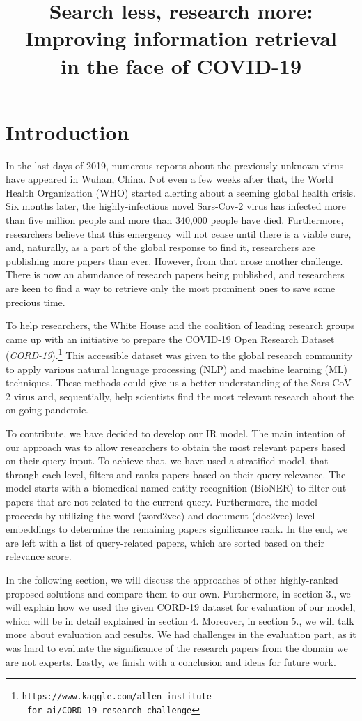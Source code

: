 \documentclass[10pt, a4paper]{article}
\title{
	Search less, research more: Improving information retrieval\\
	in the face of COVID-19\\
}
\begin{document}
	
	\maketitleabstract
	
	\section{Introduction}
	
	In the last days of 2019, numerous reports about the previously-unknown virus have appeared in Wuhan, China. Not even a few weeks after that, the World Health Organization (WHO) started alerting about a seeming global health crisis. Six months later, the highly-infectious novel Sars-Cov-2 virus has infected more than five million people and more than 340,000 people have died. Furthermore, researchers believe that this emergency will not cease until there is a viable cure, and, naturally, as a part of the global response to find it, researchers are publishing more papers than ever. However, from that arose another challenge. There is now an abundance of research papers being published, and researchers are keen to find a way to retrieve only the most prominent ones to save some precious time.
	
	To help researchers, the White House and the coalition of leading research groups came up with an initiative to prepare the COVID-19 Open Research Dataset (\emph{CORD-19}).\footnote{\texttt{https://www.kaggle.com/allen-institute\\-for-ai/CORD-19-research-challenge}} This accessible dataset was given to the global research community to apply various natural language processing (NLP) and machine learning (ML) techniques. These methods could give us a better understanding of the Sars-CoV-2 virus and, sequentially, help scientists find the most relevant research about the on-going pandemic.
	
	To contribute, we have decided to develop our IR model. The main intention of our approach was to allow researchers to obtain the most relevant papers based on their query input. To achieve that, we have used a stratified model, that through each level, filters and ranks papers based on their query relevance.  The model starts with a biomedical named entity recognition (BioNER) to filter out papers that are not related to the current query. Furthermore, the model proceeds by utilizing the word (word2vec) and document (doc2vec) level embeddings to determine the remaining papers significance rank. In the end, we are left with a list of query-related papers, which are sorted based on their relevance score.
	
	In the following section, we will discuss the approaches of other highly-ranked proposed solutions and compare them to our own. Furthermore, in section 3., we will explain how we used the given CORD-19 dataset for evaluation of our model, which will be in detail explained in section 4. Moreover, in section 5., we will talk more about evaluation and results.  We had challenges in the evaluation part, as it was hard to evaluate the significance of the research papers from the domain we are not experts. Lastly, we finish with a conclusion and ideas for future work.
	
\end{document}
